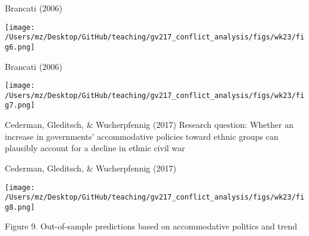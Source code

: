 \documentclass{beamer}
\begin{document}
\begin{frame}{Brancati (2006)}
    \pause
    \begin{center}
        \texttt{[image: /Users/mz/Desktop/GitHub/teaching/gv217\_conflict\_analysis/figs/wk23/fig6.png]}
    \end{center}
\end{frame}

\begin{frame}{Brancati (2006)}
    \pause
    \begin{center}
        \texttt{[image: /Users/mz/Desktop/GitHub/teaching/gv217\_conflict\_analysis/figs/wk23/fig7.png]}
    \end{center}
\end{frame}

\begin{frame}{Cederman, Gleditsch, \& Wucherpfennig (2017)}
    \pause Research question: \pause Whether an increase in governments' accommodative policies toward ethnic groups can plausibly account for a decline in ethnic civil war
\end{frame}

\begin{frame}{Cederman, Gleditsch, \& Wucherpfennig (2017)}
    \pause
    \begin{center}
        \texttt{[image: /Users/mz/Desktop/GitHub/teaching/gv217\_conflict\_analysis/figs/wk23/fig8.png]}
    \end{center}
    \tiny Figure 9. Out-of-sample predictions based on accommodative politics and trend
\end{frame}
\end{document}
